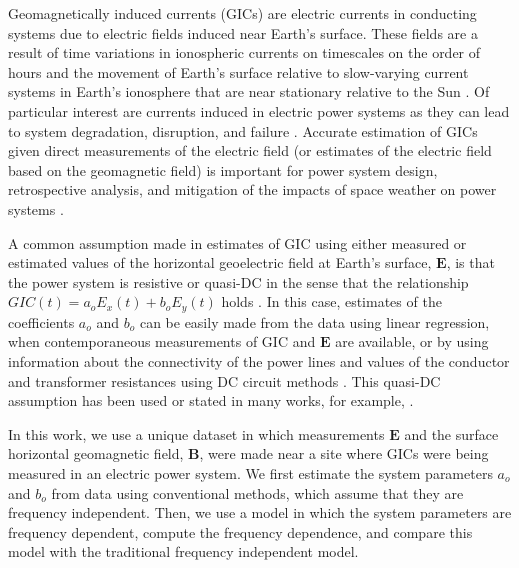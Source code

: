 \documentclass[draft,linenumbers]{agujournal2018}
\begin{document}
Geomagnetically induced currents (GICs) are electric currents in conducting systems due to electric fields induced near Earth's surface. These fields are a result of time variations in ionospheric currents on timescales on the order of hours \citep{Ohtani2000} and the movement of Earth's surface relative to slow-varying current systems in Earth's ionosphere that are near stationary relative to the Sun \citep{Stening2013}. Of particular interest are currents induced in electric power systems as they can lead to system degradation, disruption, and failure \citep{Albertson1993,NERC2012}. Accurate estimation of GICs given direct measurements of the electric field (or estimates of the electric field based on the geomagnetic field) is important for power system design, retrospective analysis, and mitigation of the impacts of space weather on power systems \citep{Molinski2002,Thomson2010,NERC2012,Gaunt2014}. 

A common assumption made in estimates of GIC using either measured or estimated values of the horizontal geoelectric field at Earth's surface, $\mathbf{E}$, is that the power system is resistive or quasi-DC in the sense that the relationship $GIC(t) = a_oE_x(t) + b_oE_y(t)$ holds \citep{Albertson1981,Lehtinen1985}. In this case, estimates of the coefficients $a_o$ and $b_o$ can be easily made from the data using linear regression, when contemporaneous measurements of GIC and $\mathbf{E}$ are available, or by using information about the connectivity of the power lines and values of the conductor and transformer resistances using DC circuit methods \citep[e.g.][]{Boteler2014a,Boteler2014b}. This quasi-DC assumption has been used or stated in many works, for example, \citet{Pulkkinen2007,Wik2008,Pulkkinen2010,Ngwira2011,Horton2012,Viljanen2012,Overbye2012,Marshall2013,Liu2014,Zheng2014,Watari2015,Bonner2017}. 



In this work, we use a unique dataset in which measurements $\mathbf{E}$ and the surface horizontal geomagnetic field, $\mathbf{B}$, were made near a site where GICs were being measured in an electric power system.  We first estimate the system parameters $a_o$ and $b_o$ from data using conventional methods, which assume that they are frequency independent. Then, we use a model in which the system parameters are frequency dependent, compute the frequency dependence, and compare this model with the traditional frequency independent model. 
\end{document}
